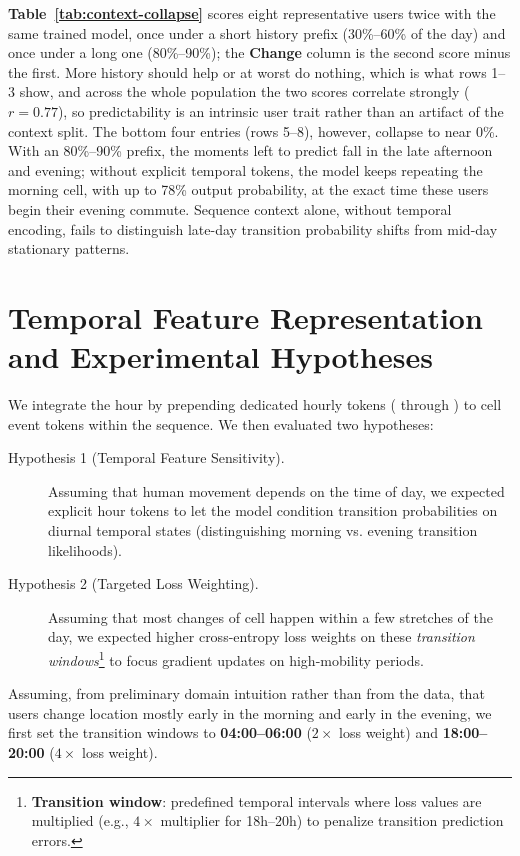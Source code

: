 \textbf{Table~\ref{tab:context-collapse}} scores eight representative users twice with the same trained model, once under a short history prefix (30\%--60\% of the day) and once under a long one (80\%--90\%); the \textbf{Change} column is the second score minus the first. More history should help or at worst do nothing, which is what rows 1--3 show, and across the whole population the two scores correlate strongly ($r = 0.77$), so predictability is an intrinsic user trait rather than an artifact of the context split. The bottom four entries (rows 5--8), however, collapse to near 0\%. With an 80\%--90\% prefix, the moments left to predict fall in the late afternoon and evening; without explicit temporal tokens, the model keeps repeating the morning cell, with up to 78\% output probability, at the exact time these users begin their evening commute. Sequence context alone, without temporal encoding, fails to distinguish late-day transition probability shifts from mid-day stationary patterns.



\section{Temporal Feature Representation and Experimental Hypotheses}

We integrate the hour by prepending dedicated hourly tokens ( through ) to cell event tokens within the sequence. We then evaluated two hypotheses:

\begin{description}
  \item[Hypothesis 1 (Temporal Feature Sensitivity).] Assuming that human movement depends on the time of day, we expected explicit hour tokens to let the model condition transition probabilities on diurnal temporal states (distinguishing morning vs. evening transition likelihoods).
  \item[Hypothesis 2 (Targeted Loss Weighting).] Assuming that most changes of cell happen within a few stretches of the day, we expected higher cross-entropy loss weights on these \emph{transition windows}\footnote{\textbf{Transition window}: predefined temporal intervals where loss values are multiplied (e.g., $4\times$ multiplier for 18h--20h) to penalize transition prediction errors.} to focus gradient updates on high-mobility periods.
\end{description}

Assuming, from preliminary domain intuition rather than from the data, that users change location mostly early in the morning and early in the evening, we first set the transition windows to \textbf{04:00--06:00} ($2\times$ loss weight) and \textbf{18:00--20:00} ($4\times$ loss weight).

